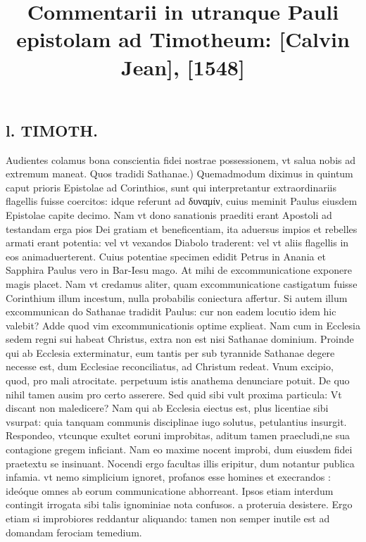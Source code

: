 \documentclass{article}
\begin{document}
\date{}
        \title{Commentarii in utranque Pauli epistolam ad Timotheum: [Calvin Jean], [1548]}
\maketitle
\tableofcontents
\clearpage
\begin{pages} 
\beginnumbering
        
\section*{l. TIMOTH. }
\marginpar{[ p.16 ]}\pstart Audientes colamus bona conscientia fidei nostrae possessionem, vt salua nobis ad extremum maneat.  \pend\pstart Quos tradidi Sathanae.) Quemadmodum diximus in quintum caput prioris Epistolae ad Corinthios, sunt qui interpretantur extraordinariis flagellis fuisse coercitos: idque referunt ad δυναμίν, cuius meminit Paulus eiusdem Epistolae capite decimo. Nam vt dono sanationis praediti erant Apostoli ad testandam erga pios Dei gratiam et beneficentiam, ita aduersus impios et rebelles armati erant potentia: vel vt vexandos Diabolo traderent: vel vt aliis flagellis in eos animaduerterent. Cuius potentiae specimen edidit Petrus in Anania et Sapphira Paulus vero in Bar-Iesu mago. At mihi de excommunicatione exponere magis placet. Nam vt credamus aliter, quam excommunicatione castigatum fuisse Corinthium illum incestum, nulla probabilis coniectura affertur. Si autem illum excommunican do Sathanae tradidit Paulus: cur non eadem locutio idem hic valebit? Adde quod vim excommunicationis optime explieat. Nam cum in Ecclesia sedem regni sui habeat Christus, extra non est nisi Sathanae dominium. Proinde qui ab Ecclesia exterminatur, eum tantis per sub tyrannide Sathanae degere necesse est, dum Ecclesiae reconciliatus, ad Christum redeat. Vnum excipio, quod, pro mali atrocitate. perpetuum istis anathema denunciare potuit. De quo nihil tamen ausim pro certo asserere. Sed quid sibi vult proxima particula: Vt discant non maledicere? Nam qui ab Ecclesia eiectus est, plus licentiae sibi vsurpat: quia tanquam communis disciplinae iugo solutus, petulantius insurgit. Respondeo, vtcunque exultet eoruni improbitas, aditum tamen praecludi,ne sua contagione gregem inficiant. Nam eo maxime nocent improbi, dum eiusdem fidei praetextu se insinuant. Nocendi ergo facultas illis eripitur, dum notantur publica infamia. vt nemo simplicium ignoret, profanos esse homines et execrandos : ideóque omnes ab eorum communicatione abhorreant. Ipsos etiam interdum contingit irrogata sibi talis ignominiae nota confusos. a proteruia desistere. Ergo etiam si improbiores reddantur aliquando: tamen non semper inutile est ad domandam ferociam temedium.  \pend

\end{pages}
\end{document}
